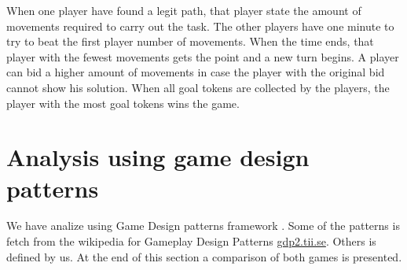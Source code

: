 \documentclass[a4paper]{article}
\begin{document}
When one player have found a legit path, that player state the amount of movements required to carry out the task. The other players have one minute to try to beat the first player number of movements. When the time ends, that player with the fewest movements gets the point and a new turn begins. A player can bid a higher amount of movements in case the player with the original bid cannot show his solution. When all goal tokens are collected by the players, the player with the most goal tokens wins the game.

\section{Analysis using game design patterns}
We have analize using Game Design patterns framework \cite{Bjork2003}. Some of the patterns is fetch from the wikipedia for Gameplay Design Patterns \url{gdp2.tii.se}. Others is defined by us. At the end of this section a comparison of both games is presented.

\newpage
\end{document}

